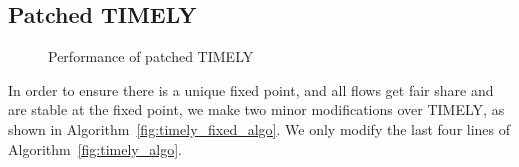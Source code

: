 \subsection {Patched TIMELY}


\begin{figure}[t]
\center
{}
\vspace{-0.5em}
\caption{Performance of patched TIMELY}
\vspace{-0.5em}
\label{fig:timely_fixed}
\end{figure}

In order to ensure there is a unique fixed point, and all flows get fair
share and are stable at the fixed point, we make two minor modifications over
TIMELY, as shown in Algorithm~\ref{fig:timely_fixed_algo}. We only modify the
last four lines of Algorithm~\ref{fig:timely_algo}.

